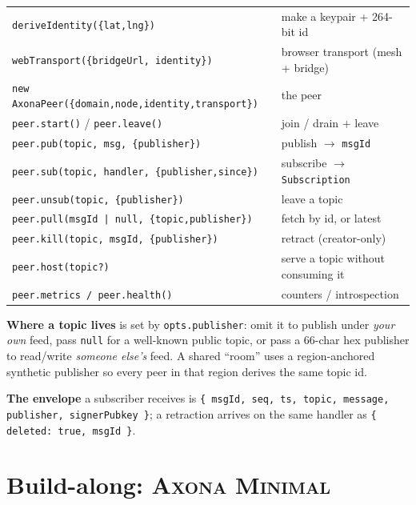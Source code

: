 \documentclass[nobib]{tufte-handout}
\begin{document}
\smallskip
\noindent\begin{tabular}{@{}ll@{}}
\toprule
\texttt{deriveIdentity(\{lat,lng\})} & make a keypair + 264-bit id \\
\texttt{webTransport(\{bridgeUrl, identity\})} & browser transport (mesh + bridge) \\
\texttt{new AxonaPeer(\{domain,node,identity,transport\})} & the peer \\
\texttt{peer.start()} / \texttt{peer.leave()} & join / drain + leave \\
\midrule
\texttt{peer.pub(topic, msg, \{publisher\})} & publish $\rightarrow$ \texttt{msgId} \\
\texttt{peer.sub(topic, handler, \{publisher,since\})} & subscribe $\rightarrow$ \texttt{Subscription} \\
\texttt{peer.unsub(topic, \{publisher\})} & leave a topic \\
\texttt{peer.pull(msgId\,|\,null, \{topic,publisher\})} & fetch by id, or latest \\
\texttt{peer.kill(topic, msgId, \{publisher\})} & retract (creator-only) \\
\texttt{peer.host(topic?)} & serve a topic without consuming it \\
\texttt{peer.metrics / peer.health()} & counters / introspection \\
\bottomrule
\end{tabular}

\smallskip
\textbf{Where a topic lives} is set by \texttt{opts.publisher}: omit it to
publish under \emph{your own} feed, pass \texttt{null} for a well-known public
topic, or pass a 66-char hex publisher to read/write \emph{someone else's} feed.
A shared ``room'' uses a region-anchored synthetic publisher so every peer in
that region derives the same topic id.

\textbf{The envelope} a subscriber receives is \texttt{\{ msgId, seq, ts, topic,
message, publisher, signerPubkey \}}; a retraction arrives on the same handler as
\texttt{\{ deleted: true, msgId \}}.

\section{Build-along: \textsc{Axona Minimal}}
\end{document}
